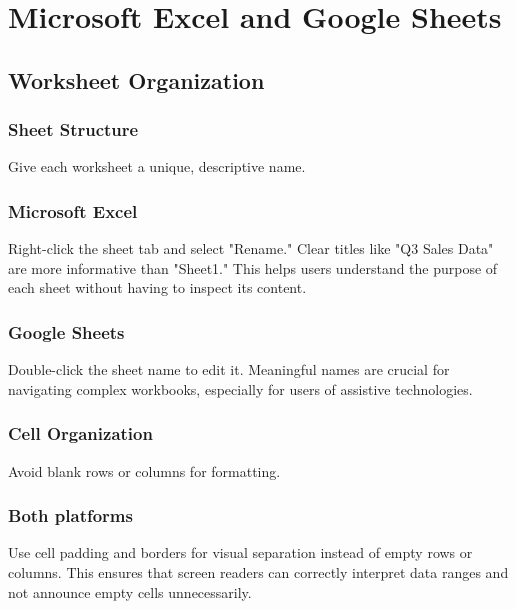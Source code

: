 \section{Microsoft Excel and Google Sheets}\label{ch15:sec:excel-sheets}

\subsection{Worksheet Organization}\label{ch15:ssec:worksheet-org}

\subsubsection{Sheet Structure}\label{ch15:sssec:sheet-structure}
Give each worksheet a unique, descriptive name.

\subsubsection{Microsoft Excel}\label{ch15:sssec:excel-sheet-structure}
Right-click the sheet tab and select "Rename." Clear titles like "Q3 Sales Data" are more informative than "Sheet1." This helps users understand the purpose of each sheet without having to inspect its content.

\subsubsection{Google Sheets}\label{ch15:sssec:sheets-sheet-structure}
Double-click the sheet name to edit it. Meaningful names are crucial for navigating complex workbooks, especially for users of assistive technologies.

\subsubsection{Cell Organization}\label{ch15:sssec:cell-org}
Avoid blank rows or columns for formatting.

\subsubsection{Both platforms}\label{ch15:sssec:cell-org-both}
Use cell padding and borders for visual separation instead of empty rows or columns. This ensures that screen readers can correctly interpret data ranges and not announce empty cells unnecessarily.

